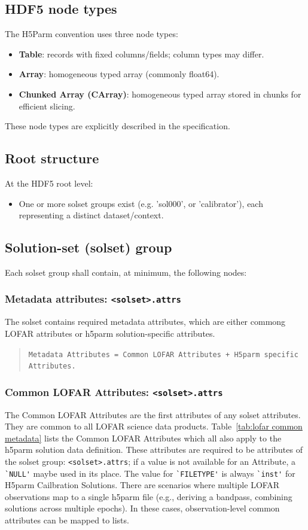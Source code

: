 \documentclass[a4paper,10pt,bibtotoc]{scrartcl}
\begin{document}
\subsection{HDF5 node types}
The H5Parm convention uses three node types:
\begin{itemize}
  \item \textbf{Table}: records with fixed columns/fields; column types may differ.
  \item \textbf{Array}: homogeneous typed array (commonly float64).
  \item \textbf{Chunked Array (CArray)}: homogeneous typed array stored in chunks for efficient slicing.
\end{itemize}
These node types are explicitly described in the specification. 

\subsection{Root structure}
At the HDF5 root level:
\begin{itemize}
  \item One or more solset groups exist (e.g. 'sol000', or 'calibrator'), each representing a distinct dataset/context.
\end{itemize}

\subsection{Solution-set (solset) group}
Each solset group shall contain, at minimum, the following nodes:


\subsubsection{Metadata attributes: \texttt{<solset>.attrs}}
The solset contains required metadata attributes, which are either commong LOFAR attributes or h5parm solution-specific attributes.

\begin{verse}
\verb|Metadata Attributes = Common LOFAR Attributes + H5parm specific Attributes.|
\end{verse}


\subsubsection*{Common LOFAR Attributes: \texttt{<solset>.attrs}}
The Common LOFAR Attributes are the first attributes of any solset attributes. They are common to all LOFAR science data products.  
Table~\ref{tab:lofar common metadata} lists the Common LOFAR Attributes which all also apply to the h5parm solution data definition. These attributes are required to be attributes of the solset group: \texttt{<solset>.attrs}; if a value is not available for an Attribute, a \verb|`NULL'| maybe used in its place. The value for \verb|`FILETYPE'| is always \verb|`inst'| for H5parm Cailbration Solutions.
There are scenarios where multiple LOFAR observations map to a single h5parm file (e.g., deriving a bandpass, combining solutions across multiple epochs). In these cases, observation-level common attributes can be mapped to lists.

\end{document}
